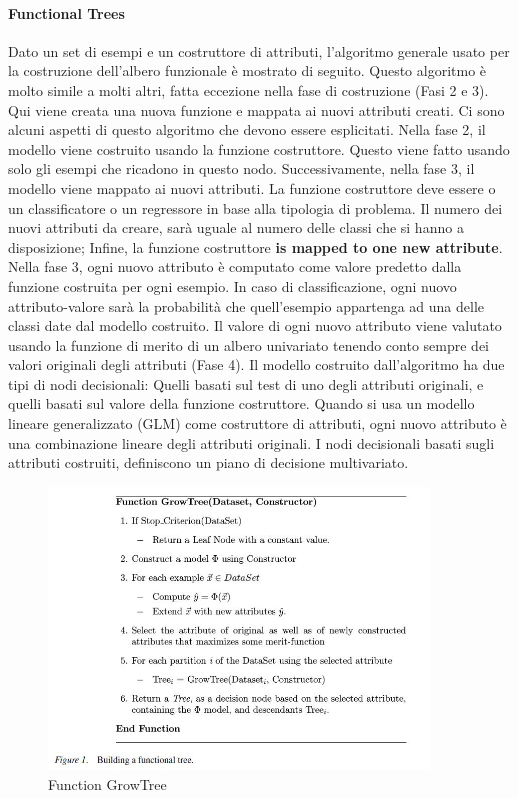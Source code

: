 \paragraph{Functional Trees}
Dato un set di esempi e un costruttore di attributi, l'algoritmo generale usato per la costruzione dell'albero funzionale è mostrato di seguito. Questo algoritmo è molto simile a molti altri, fatta eccezione nella fase di costruzione (Fasi 2 e 3). Qui viene creata una nuova funzione e mappata ai nuovi attributi creati. Ci sono alcuni aspetti di questo algoritmo che devono essere esplicitati. Nella fase 2, il modello viene costruito usando la funzione costruttore. Questo viene fatto usando solo gli esempi che ricadono in questo nodo. Successivamente, nella fase 3, il modello viene mappato ai nuovi attributi. La funzione costruttore deve essere o un classificatore o un regressore in base alla tipologia di problema. Il numero dei nuovi attributi da creare, sarà uguale al numero delle classi che si hanno a disposizione; Infine, la funzione costruttore \textbf{is mapped to one new attribute}. Nella fase 3, ogni nuovo attributo è computato come valore predetto dalla funzione costruita per ogni esempio. In caso di classificazione, ogni nuovo attributo-valore sarà la probabilità che quell'esempio appartenga ad una delle classi date dal modello costruito.
Il valore di ogni nuovo attributo viene valutato usando la funzione di merito di un albero univariato tenendo conto sempre dei valori originali degli attributi (Fase 4). Il modello costruito dall'algoritmo ha due tipi di nodi decisionali: Quelli basati sul test di uno degli attributi originali, e quelli basati sul valore della funzione costruttore. Quando si usa un modello lineare generalizzato (GLM) come costruttore di attributi, ogni nuovo attributo è una combinazione lineare degli attributi originali. I nodi decisionali basati sugli attributi costruiti, definiscono un piano di decisione multivariato.

\begin{figure}[hbtp]
	\centering
	\includegraphics[width=0.9\textwidth]{./images/FunctionGrowTree.JPG}
	\caption{Function GrowTree}
\end{figure}

